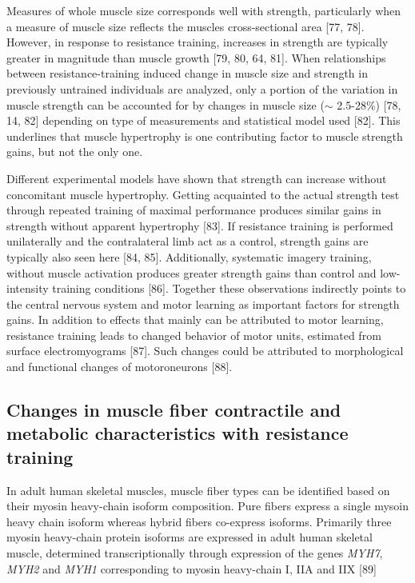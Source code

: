 \documentclass[twoside,10pt]{gihclass} %
\begin{document}
Measures of whole muscle size corresponds well with strength, particularly when a measure of muscle size reflects the muscles cross-sectional area
{[}77, 78{]}.
However, in response to resistance training, increases in strength are typically greater in magnitude than muscle growth
{[}79, 80, 64, 81{]}.
When relationships between resistance-training induced change in muscle size and strength in previously untrained individuals are analyzed, only a portion of the variation in muscle strength can be accounted for by changes in muscle size (\(\sim\) 2.5-28\%)
{[}78, 14, 82{]}
depending on type of measurements and statistical model used
{[}82{]}.
This underlines that muscle hypertrophy is one contributing factor to muscle strength gains, but not the only one.

Different experimental models have shown that strength can increase without concomitant muscle hypertrophy.
Getting acquainted to the actual strength test through repeated training of maximal performance produces similar gains in strength without apparent hypertrophy
{[}83{]}.
If resistance training is performed unilaterally and the contralateral limb act as a control, strength gains are typically also seen here
{[}84, 85{]}.
Additionally, systematic imagery training, without muscle activation produces greater strength gains than control and low-intensity training conditions
{[}86{]}.
Together these observations indirectly points to the central nervous system and motor learning as important factors for strength gains.
In addition to effects that mainly can be attributed to motor learning, resistance training leads to changed behavior of motor units, estimated from surface electromyograms
{[}87{]}.
Such changes could be attributed to morphological and functional changes of motoroneurons
{[}88{]}.

\hypertarget{changes-in-muscle-fiber-contractile-and-metabolic-characteristics-with-resistance-training}{%
\subsection{Changes in muscle fiber contractile and metabolic characteristics with resistance training}\label{changes-in-muscle-fiber-contractile-and-metabolic-characteristics-with-resistance-training}}

In adult human skeletal muscles, muscle fiber types can be identified based on their myosin heavy-chain isoform composition. Pure fibers express a single mysoin heavy chain isoform whereas hybrid fibers co-express isoforms.
Primarily three myosin heavy-chain protein isoforms are expressed in adult human skeletal muscle, determined transcriptionally through expression of the genes \emph{MYH7}, \emph{MYH2} and \emph{MYH1} corresponding to myosin heavy-chain I, IIA and IIX
{[}89{]}
\end{document}
